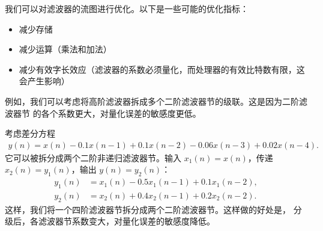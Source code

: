 \begin{remark}[滤波器流图优化]
    我们可以对滤波器的流图进行优化。以下是一些可能的优化指标：
    \begin{itemize}
        \item 减少存储
        \item 减少运算（乘法和加法）
        \item 减少有效字长效应（滤波器的系数必须量化，而处理器的有效比特数有限，这会产生影响）
    \end{itemize}

    例如，我们可以考虑将高阶滤波器拆成多个二阶滤波器节的级联。这是因为二阶滤波器节
    的各个系数更大，对量化误差的敏感度更低。
\end{remark}

\begin{example}[二阶非递归滤波器节级联]
    考虑差分方程
    \begin{align*}
        y(n) = x(n) - 0.1x(n - 1) + 0.1x(n - 2) - 0.06x(n - 3) + 0.02x(n - 4).
    \end{align*}
    它可以被拆分成两个二阶非递归滤波器节。输入 $x_1(n) = x(n)$，传递 $x_2(n) = y_1(n)$，输出 $y(n) = y_2(n)$：
    \begin{align*}
        y_1(n) & = x_1(n) - 0.5x_1(n - 1) + 0.1x_1(n - 2), \\
        y_2(n) & = x_2(n) + 0.4x_2(n - 1) + 0.2x_2(n - 2).
    \end{align*}
    这样，我们将一个四阶滤波器节拆分成两个二阶滤波器节。这样做的好处是，
    分级后，各滤波器节系数变大，对量化误差的敏感度降低。
\end{example}

